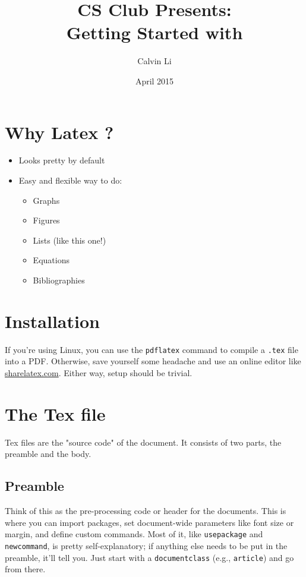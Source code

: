 \documentclass{article}
\title{ {\Large CS Club Presents:} \\ \textbf{Getting Started with \latex} }
\author{Calvin Li}
\date{April 2015}
\begin{document}
\maketitle

\section*{Why Latex ?}

\begin{itemize}
\item Looks pretty by default
\item Easy and flexible way to do: 
    \begin{itemize}
    \item Graphs
    \item Figures
    \item Lists (like this one!)
    \item Equations
    \item Bibliographies
    \end{itemize}
\end{itemize}

\section*{Installation}
If you're using Linux, you can use the \texttt{pdflatex} command to compile a \texttt{.tex} file into a PDF. Otherwise, save yourself some headache and use an online editor like \textcolor{blue}{\url{sharelatex.com}}. Either way, setup should be trivial.

\section*{The Tex file}
Tex files are the "source code" of the document. It consists of two parts, the preamble and the body.

\subsection*{Preamble}
Think of this as the pre-processing code or header for the documents. This is where you can import packages, set document-wide parameters like font size or margin, and define custom commands. Most of it, like \texttt{usepackage} and \texttt{newcommand}, is pretty self-explanatory; if anything else needs to be put in the preamble, it'll tell you. Just start with a \texttt{documentclass} (e.g., \texttt{article}) and go from there.
\end{document}
